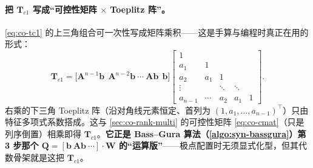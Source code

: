 \paragraph{把 \texorpdfstring{$\mathbf{T}_{c1}$}{Tc1} 写成“可控性矩阵 $\times$ Toeplitz 阵”。}
\cref{eq:co-tc1} 的上三角组合可一次性写成矩阵乘积——这是手算与编程时真正在用的形式：
\begin{equation}
  \mathbf{T}_{c1}=\big[\mathbf{A}^{n-1}\mathbf{b}\ \ \mathbf{A}^{n-2}\mathbf{b}\ \cdots\ \mathbf{A}\mathbf{b}\ \ \mathbf{b}\big]
  \begin{bmatrix}
    1 & & & & \\
    a_1 & 1 & & & \\
    a_2 & a_1 & 1 & & \\
    \vdots & & \ddots & \ddots & \\
    a_{n-1} & \cdots & a_2 & a_1 & 1
  \end{bmatrix}.
  \label{eq:co-tc1-toeplitz}
\end{equation}
右乘的下三角 Toeplitz 阵（沿对角线元素恒定、首列为 $(1,a_1,\dots,a_{n-1})^\top$）只由特征多项式系数搭成。这与 \cref{sec:co-rank-multi} 的可控性矩阵 \cref{eq:co-cmat}（只是列序倒置）相乘即得 $\mathbf{T}_{c1}$。\textbf{它正是 Bass--Gura 算法（\cref{algo:syn-bassgura}）第 3 步那个 $\mathbf{Q}=[\mathbf{b}\ \mathbf{A}\mathbf{b}\ \cdots]\cdot\mathbf{W}$ 的“运算版”}——极点配置时无须显式化型，但其代数骨架就是这把 $\mathbf{T}_{c1}$。

